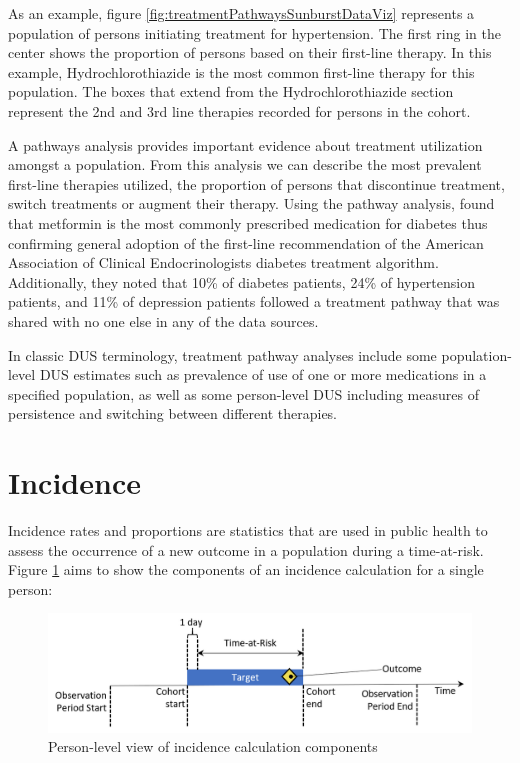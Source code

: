 \documentclass[11pt]{book}
\theoremstyle{definition}
\theoremstyle{definition}
\theoremstyle{definition}
\theoremstyle{remark}
\begin{document}
As an example, figure \ref{fig:treatmentPathwaysSunburstDataViz} represents a population of persons initiating treatment for hypertension. The first ring in the center shows the proportion of persons based on their first-line therapy. In this example, Hydrochlorothiazide is the most common first-line therapy for this population. The boxes that extend from the Hydrochlorothiazide section represent the 2nd and 3rd line therapies recorded for persons in the cohort.

A pathways analysis provides important evidence about treatment utilization amongst a population. From this analysis we can describe the most prevalent first-line therapies utilized, the proportion of persons that discontinue treatment, switch treatments or augment their therapy. Using the pathway analysis, \citet{Hripcsak7329} found that metformin is the most commonly prescribed medication for diabetes thus confirming general adoption of the first-line recommendation of the American Association of Clinical Endocrinologists diabetes treatment algorithm. Additionally, they noted that 10\% of diabetes patients, 24\% of hypertension patients, and 11\% of depression patients followed a treatment pathway that was shared with no one else in any of the data sources.

In classic DUS terminology, treatment pathway analyses include some population-level DUS estimates such as prevalence of use of one or more medications in a specified population, as well as some person-level DUS including measures of persistence and switching between different therapies.

\hypertarget{incidence}{%
\section{Incidence}\label{incidence}}

Incidence rates and proportions are statistics that are used in public health to assess the occurrence of a new outcome in a population during a time-at-risk. Figure \ref{fig:incidenceTimeline} aims to show the components of an incidence calculation for a single person: 

\begin{figure}

{\centering \includegraphics[width=1\linewidth]{images/Characterization/incidenceTimeline} 

}

\caption{Person-level view of incidence calculation components}\label{fig:incidenceTimeline}
\end{figure}
\end{document}
